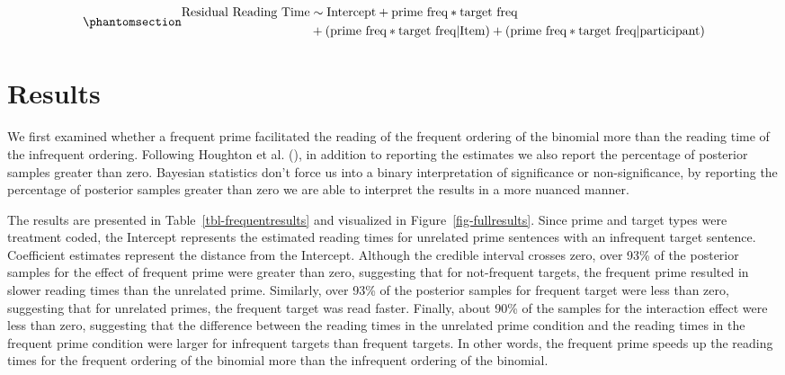 \documentclass[
  12pt,
]{scrartcl}
\begin{document}
\begin{equation}\phantomsection\label{eq-models}{
\begin{aligned}
\text{Residual Reading Time} & \sim \text{Intercept} + \text{prime freq} * \text{target freq} \\ 
&+ (\text{prime freq} * \text{target freq} | \text{Item}) + (\text{prime freq} * \text{target freq} | \text{participant})
\end{aligned}
}\end{equation}

\section{Results}\label{results}

We first examined whether a frequent prime facilitated the reading of
the frequent ordering of the binomial more than the reading time of the
infrequent ordering. Following Houghton et al.
(),
in addition to reporting the estimates we also report the percentage of
posterior samples greater than zero. Bayesian statistics don't force us
into a binary interpretation of significance or non-significance, by
reporting the percentage of posterior samples greater than zero we are
able to interpret the results in a more nuanced manner.

The results are presented in Table~\ref{tbl-frequentresults} and
visualized in Figure~\ref{fig-fullresults}. Since prime and target types
were treatment coded, the Intercept represents the estimated reading
times for unrelated prime sentences with an infrequent target sentence.
Coefficient estimates represent the distance from the Intercept.
Although the credible interval crosses zero, over 93\% of the posterior
samples for the effect of frequent prime were greater than zero,
suggesting that for not-frequent targets, the frequent prime resulted in
slower reading times than the unrelated prime. Similarly, over 93\% of
the posterior samples for frequent target were less than zero,
suggesting that for unrelated primes, the frequent target was read
faster. Finally, about 90\% of the samples for the interaction effect
were less than zero, suggesting that the difference between the reading
times in the unrelated prime condition and the reading times in the
frequent prime condition were larger for infrequent targets than
frequent targets. In other words, the frequent prime speeds up the
reading times for the frequent ordering of the binomial more than the
infrequent ordering of the binomial.
\end{document}
